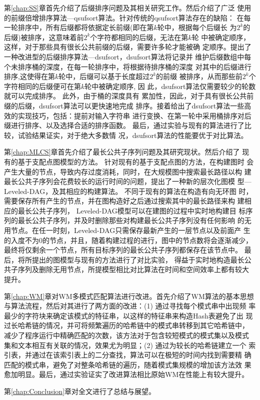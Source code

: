 第\ref{chap:SS}章首先介绍了后缀排序问题及其相关研究工作。然后介绍了广泛
使用的前缀倍增排序算法---qsufsort算法。针对传统的qsufsort算法存在的缺陷：
在每一轮排序中，所有后缀都将依据定长前缀(即在第$k$轮中，根据每个后缀长
为$2^k$的后缀)被排序，这意味着前$2^k$个字符都相同的后缀，无法在第$k$轮
中被确定顺序，这样，对于那些具有很长公共前缀的后缀，需要许多轮才能被确
定顺序。提出了一种改进型的后缀排序算法---dsufsort，dsufsort算法将记录并
维护后缀数组中每个未排序桶的深度，在每一轮排序中，将根据待排序桶的深度
对其中的后缀进行排序,这使得在第$k$轮中，后缀可以基于长度超过$2^k$的前缀
被排序，从而那些前$2^k$个字符相同的后缀便可在第$k$轮中被确定顺序, 因
此，dsufsort算法仅需要较少的轮数就可以完成排序。 此外，由于桶的深度具有
累加性，因此，对于具有很长公共前缀的后缀，dsufsort算法可以更快速地完成
排序。接着给出了dsufsort算法一些高效的实现技巧，包括：提前对输入字符串
进行变换、在第一轮中采用桶排序对后缀进行排序、以及选择合适的排序函数。
最后，通过实验与现有的算法进行了比较，试验结果证实，对于绝大多数情
况，dsufsort算法的性能要优于对比算法。

第\ref{chap:MLCS}章首先介绍了最长公共子序列问题及其研究现状。然后介绍了
现有的基于支配点图模型的方法。 针对现有的基于支配点图的方法，在构建图时
会产生大量的节点，导致内存过度消耗，同时，在大规模图中搜索最长路径以构
建最长公共子序列会花费较长的运行时间的问题，提出了一种新的层次化图模
型---Leveled-DAG，及其相应的构建算法。 不同于现有的算法在构造有向无环图
时，需要保存所有产生的节点，并在图构造好之后通过搜索其中的最长路径来构
建相应的最长公共子序列， Leveled-DAG模型可以在建图的过程中实时地构建目
标序列的最长公共子序列，并及时删除那些对构建最长公共子序列没有任何影响
的无用节点。在任一时刻，Leveled-DAG只需保存最新产生的一层节点以及前面产
生的入度不为0的节点，并且，随着构建过程的进行，图中的节点数将会逐渐减少，
最终将仅剩余一个节点，所有目标序列的最长公共子序列都保存在该节点中。 最
后，将所提出的图模型与现有的方法进行了对比实验， 得益于实时地构造最长公
共子序列及删除无用节点，所提模型相比对比算法在时间和空间效率上都有较大
提升。

第\ref{chap:WM}章对WM多模式匹配算法进行改进。首先介绍了WM算法的基本思想
与算法流程，然后对其进行了两方面的改进：(1) 通过寻找每个模式串中出现频
率最少的字符块来确定该模式的特征串，以这样的特征串来构造Hash表避免了出
现过长哈希链的情况，并可将频繁遍历的哈希链中的模式串转移到其它哈希链中，
减少了程序运行中精确匹配的次数，该方法对于包含较短模式的模式集以及模式
集和文本相互有关联的情况，效果尤为明显；(2) 通过为较长的哈希链建立一个
索引表，并通过在该索引表上的二分查找，算法可以在极短的时间内找到需要精
确匹配的模式串，避免了对整条哈希链的遍历，随着模式集规模的增加该方法效
果愈加明显。最后，通过实验证实了改进算法相比原始WM在性能上有较大提升。

第\ref{chap:Conclusion}章对全文进行了总结与展望。
